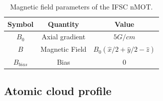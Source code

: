 \begin{table}[ht!]
    \centering
    \begin{tabular}{|c|c|c|}
        \hline
        \textbf{Symbol} & \textbf{Quantity} & \textbf{Value} \\ \hline
        $ B_0 $ & Axial gradient & $ 5 G / cm $ \\
        $ B $ & Magnetic Field & $ B_0(\hat{x}/2 + \hat{y}/2 - \hat{z}) $ \\
        $ B_{bias} $ & Bias & $ 0 $ \\
        \hline
    \end{tabular}
    \caption{Magnetic field parameters of the IFSC nMOT.}
    \label{tab:IFSC-magnetic-field}
\end{table}

\subsection{Atomic cloud profile}
\label{sec:cloud-profile-dysprosium}

